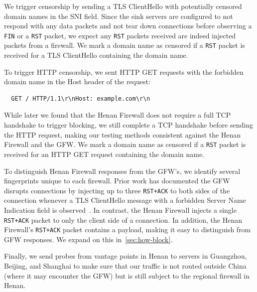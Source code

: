 \documentclass[conference,compsoc]{IEEEtran}
\begin{document}
We trigger censorship by sending a TLS ClientHello with potentially censored domain names in the SNI field.
Since the sink servers are configured to not respond with any data packets
and not tear down connections before observing a \texttt{FIN} or a \texttt{RST} packet,
we expect any \texttt{RST} packets received are indeed injected packets from a firewall.
We mark a domain name as censored if a \texttt{RST} packet is received for a TLS ClientHello containing the domain name.

To trigger HTTP censorship,
we sent HTTP GET requests with the forbidden domain name in the Host header of the request:
\begin{verbatim}
  GET / HTTP/1.1\r\nHost: example.com\r\n
\end{verbatim}
While later we found that the Henan Firewall does not require a full TCP handshake to trigger blocking,
we still complete a TCP handshake before sending the HTTP request,
making our testing methods consistent against the Henan Firewall and the GFW.
We mark a domain name as censored if a \texttt{RST} packet is received for an HTTP GET request containing the domain name.


To distinguish Henan Firewall responses from the GFW's, we identify several
fingerprints unique to each firewall.
Prior work has documented the GFW disrupts
connections by injecting up to three \texttt{RST+ACK} to both sides of the connection
whenever a TLS ClientHello message with a forbidden Server Name Indication field is observed~\cite{Chai2019a,Bock2020b}.
In contrast, the Henan Firewall injects a single \texttt{RST+ACK} packet
to only the client side of a connection.
In addition, the Henan Firewall's \texttt{RST+ACK} packet contains a payload,
making it easy to distinguish from GFW responses.
We expand on this in~\autoref{sec:how-block}.

Finally, we send probes from vantage points in Henan to servers in Guangzhou, Beijing, and Shanghai to make sure that our traffic is not routed outside China (where it may encounter the GFW) but is still subject to the regional firewall in Henan.
\end{document}
